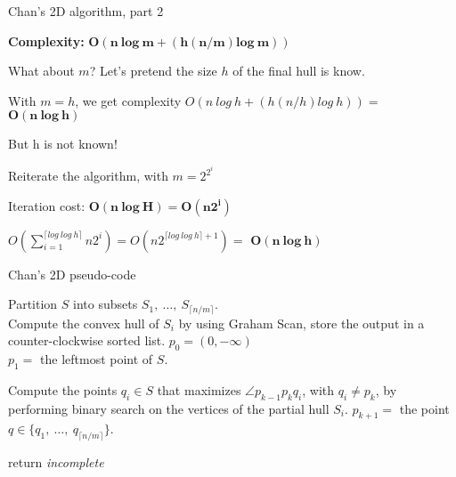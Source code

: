 \documentclass[14pt, handout]{beamer}
\begin{document}
\begin{frame}{Chan's 2D algorithm, part 2}
	\begin{center}
		\vspace{-5mm}
		\begin{fullpageitemize}
			\item<1-> \textbf{Complexity:} \textcolor{colorgreen}{$\bm{O(n\ log\ m + (h(n/m)log\ m))}$}
			\item<2-> What about $m$? Let's pretend the size $h$ of the final hull is know.
			\item<3-> With $m = h$, we get complexity $O(n\ log\ h + (h(n/h)log\ h)) =$ \textcolor{colorgreen}{$\bm{O(n\ log\ h)}$}
			\item<4-> But h is not known! 
			
			\fontsize{12}{14}\notosansfont
			\begin{sublist}
				\item<5-> Reiterate the algorithm, with $m = 2^{2^{i}}$
				\item<6-> Iteration cost: \textcolor{colorgreen}{$\bm{O(n\ log\ H) = O(n2^i)}$}
				\item<7-> $O\left(\sum_{i = 1}^{\lceil log\ log\ h\rceil}{n2^i}\right) = O(n2^{\lceil log\ log\ h\rceil + 1}) =$ \textcolor{colorgreen}{$\bm{O(n\ log\ h)}$}
			\end{sublist}
			
			
		\end{fullpageitemize}
	\end{center}
\end{frame}

\begin{frame}{Chan's 2D pseudo-code}
	\fontsize{8}{10}\notosansfont
	\begin{algorithm}[H]
		\DontPrintSemicolon
		\SetAlgoVlined
		Partition $S$ into subsets $S_1,\ \ldots,\ S_{\lceil n/m \rceil}$.\\
		{
			Compute the convex hull of $S_i$ by using Graham Scan, store the output in a counter-clockwise sorted list.
		}  
		$p_0 = (0, -\infty)$\\
		$p_1 =$ the leftmost point of $S$.
		
		{
			{
				Compute the points $q_i \in S$ that maximizes $\angle p_{k-1}p_kq_i$, with $q_i \ne p_k$, by performing binary search on the vertices of the partial hull $S_i$.
			}
			$p_{k+1} = $ the point $q \in \{q_1,\ \ldots,\ q_{\lceil n/m \rceil}\}$.\\
		}
		
		return \textit{incomplete}
		\caption{ChanHullStep, a step of Chan's algorithm}
	\end{algorithm}
\end{frame}
\end{document}
